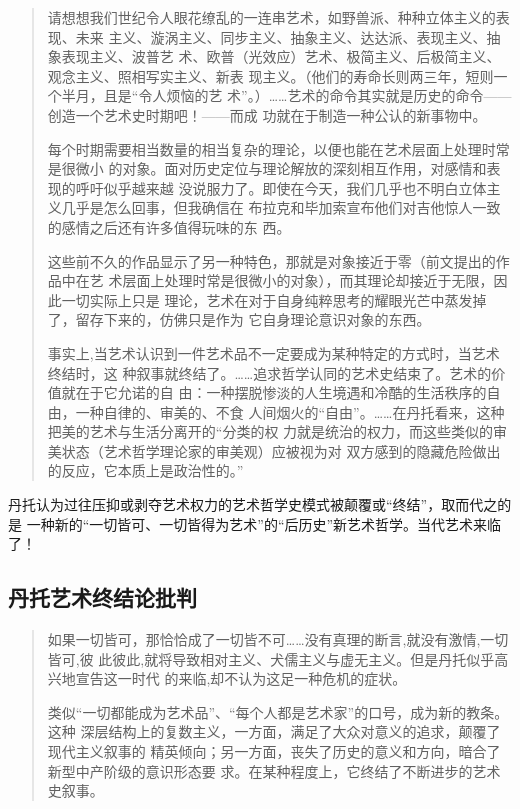 \begin{quotation}

  请想想我们世纪令人眼花缭乱的一连串艺术，如野兽派、种种立体主义的表现、未来
  主义、漩涡主义、同步主义、抽象主义、达达派、表现主义、抽象表现主义、波普艺
  术、欧普（光效应）艺术、极简主义、后极简主义、观念主义、照相写实主义、新表
  现主义。（他们的寿命长则两三年，短则一个半月，且是“令人烦恼的艺
  术”。）……艺术的命令其实就是历史的命令——创造一个艺术史时期吧！——而成
  功就在于制造一种公认的新事物中。

  每个时期需要相当数量的相当复杂的理论，以便也能在艺术层面上处理时常是很微小
  的对象。面对历史定位与理论解放的深刻相互作用，对感情和表现的呼吁似乎越来越
  没说服力了。即使在今天，我们几乎也不明白立体主义几乎是怎么回事，但我确信在
  布拉克和毕加索宣布他们对吉他惊人一致的感情之后还有许多值得玩味的东
  西。\cite[122]{7214029774}

  这些前不久的作品显示了另一种特色，那就是对象接近于零（前文提出的作品中在艺
  术层面上处理时常是很微小的对象），而其理论却接近于无限，因此一切实际上只是
  理论，艺术在对于自身纯粹思考的耀眼光芒中蒸发掉了，留存下来的，仿佛只是作为
  它自身理论意识对象的东西。\cite[126]{7214029774}

  事实上,当艺术认识到一件艺术品不一定要成为某种特定的方式时，当艺术终结时，这
  种叙事就终结了。……追求哲学认同的艺术史结束了。艺术的价值就在于它允诺的自
  由：一种摆脱惨淡的人生境遇和冷酷的生活秩序的自由，一种自律的、审美的、不食
  人间烟火的“自由”。……在丹托看来，这种把美的艺术与生活分离开的“分类的权
  力就是统治的权力，而这些类似的审美状态（艺术哲学理论家的审美观）应被视为对
  双方感到的隐藏危险做出的反应，它本质上是政治性的。”\cite{dantuozhenduan}

\end{quotation}

丹托认为过往压抑或剥夺艺术权力的艺术哲学史模式被颠覆或“终结”，取而代之的是
一种新的“一切皆可、一切皆得为艺术”的“后历史”新艺术哲学。当代艺术来临了！

\subsection{丹托艺术终结论批判}

\begin{quotation}

  如果一切皆可，那恰恰成了一切皆不可……没有真理的断言,就没有激情,一切皆可,彼
  此彼此,就将导致相对主义、犬儒主义与虚无主义。但是丹托似乎高兴地宣告这一时代
  的来临,却不认为这足一种危机的症状。\cite{fuwendantuo}

  类似“一切都能成为艺术品”、“每个人都是艺术家”的口号，成为新的教条。这种
  深层结构上的复数主义，一方面，满足了大众对意义的追求，颠覆了现代主义叙事的
  精英倾向；另一方面，丧失了历史的意义和方向，暗合了新型中产阶级的意识形态要
  求。在某种程度上，它终结了不断进步的艺术史叙事。\cite{dantuozhenduan}
\end{quotation}

